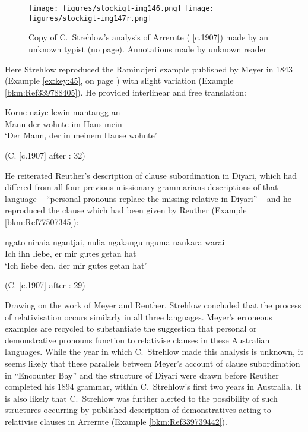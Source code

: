 \begin{figure}
\texttt{[image: figures/stockigt-img146.png]}
\texttt{[image: figures/stockigt-img147r.png]}
\caption{Copy of C.~Strehlow's analysis of Arrernte (\citeyear{strehlow_grammatik_1931} [c.1907]) made by an unknown typist (no page). Annotations made by unknown reader}
\label{bkm:Ref339787928}
\label{fig:key:9-200}
\end{figure}


Here Strehlow reproduced the Ramindjeri example published by Meyer in 1843 (Example \ref{ex:key:45}, on page \pageref{ex:key:45}) with slight variation (Example \ref{bkm:Ref339788405}). He provided interlinear and free translation:

\ea
\gll    \label{bkm:Ref339788405}Korne    naiye    lewin    mantangg  an\\
Mann      der       wohnte im Haus  mein\\
\glt `Der Mann, der in meinem Hause wohnte'

(C. \citealt{strehlow_grammatik_1931} [c.1907] after \citet{meyer_vocabulary_1843}: 32)
\z

\largerpage
He reiterated Reuther’s description of clause subordination in Diyari, which had differed from all four previous missionary-grammarians descriptions of that language -- “personal pronouns replace the missing relative in Diyari” -- and he reproduced the clause which had been given by Reuther (Example \ref{bkm:Ref77507345}):

\ea
\gll    \label{bkm:Ref77507345}ngato    ninaia    ngantjai,    nulia   ngakangu    nguma   nankara   warai\\
Ich ihn liebe, er mir gutes getan hat\\
\glt `Ich liebe den, der mir gutes getan hat'

(C. \citealt{strehlow_grammatik_1931} [c.1907] after \citealt{reuther_dieri_1894}: 29)
\z

Drawing on the work of Meyer and Reuther, Strehlow concluded that the process of relativisation occurs similarly in all three languages. Meyer’s erroneous examples are recycled to substantiate the suggestion that personal or demonstrative pronouns function to relativise clauses in these Australian languages. While the year in which C.~Strehlow made this analysis is unknown, it seems likely that these parallels between Meyer’s account of clause subordination in “Encounter Bay” and the structure of Diyari were drawn before Reuther completed his 1894 grammar, within C.~Strehlow’s first two years in Australia. It is also likely that C.~Strehlow was further alerted to the possibility of such structures occurring by  published description of demonstratives acting to relativise clauses in Arrernte (Example \ref{bkm:Ref339739442}).

